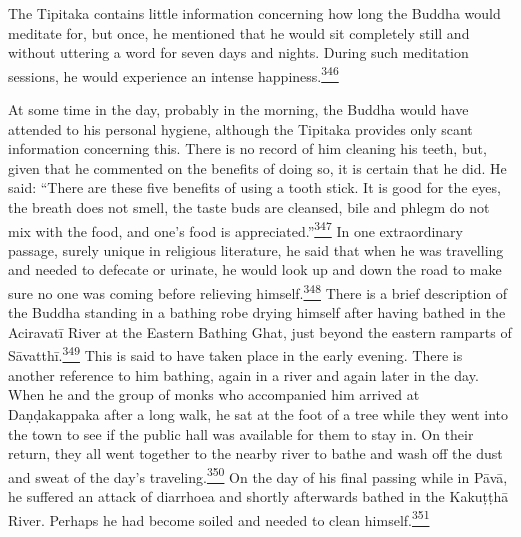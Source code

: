 The Tipitaka contains little information concerning how long the Buddha
would meditate for, but once, he mentioned that he would sit completely
still and without uttering a word for seven days and nights. During such
meditation sessions, he would experience an intense
happiness.\label{footprints_split_011.html_fnref346}\hyperref[footprints_split_024.htmlux5cux23fn346]{\textsuperscript{346}}

At some time in the day, probably in the morning, the Buddha would have
attended to his personal hygiene, although the Tipitaka provides only
scant information concerning this. There is no record of him cleaning
his teeth, but, given that he commented on the benefits of doing so, it
is certain that he did. He said: ``There are these five benefits of
using a tooth stick. It is good for the eyes, the breath does not smell,
the taste buds are cleansed, bile and phlegm do not mix with the food,
and one's food is
appreciated.''\label{footprints_split_011.html_fnref347}\hyperref[footprints_split_024.htmlux5cux23fn347]{\textsuperscript{347}}
In one extraordinary passage, surely unique in religious literature, he
said that when he was travelling and needed to defecate or urinate, he
would look up and down the road to make sure no one was coming before
relieving
himself.\label{footprints_split_011.html_fnref348}\hyperref[footprints_split_024.htmlux5cux23fn348]{\textsuperscript{348}}
There is a brief description of the Buddha standing in a bathing robe
drying himself after having bathed in the Aciravatī River at the Eastern
Bathing Ghat, just beyond the eastern ramparts of
Sāvatthī.\label{footprints_split_011.html_fnref349}\hyperref[footprints_split_024.htmlux5cux23fn349]{\textsuperscript{349}}
This is said to have taken place in the early evening. There is another
reference to him bathing, again in a river and again later in the day.
When he and the group of monks who accompanied him arrived at
Daṇḍakappaka after a long walk, he sat at the foot of a tree while they
went into the town to see if the public hall was available for them to
stay in. On their return, they all went together to the nearby river to
bathe and wash off the dust and sweat of the day's
traveling.\label{footprints_split_011.html_fnref350}\hyperref[footprints_split_024.htmlux5cux23fn350]{\textsuperscript{350}}
On the day of his final passing while in Pāvā, he suffered an attack of
diarrhoea and shortly afterwards bathed in the Kakuṭṭhā River. Perhaps
he had become soiled and needed to clean
himself.\label{footprints_split_011.html_fnref351}\hyperref[footprints_split_024.htmlux5cux23fn351]{\textsuperscript{351}}


